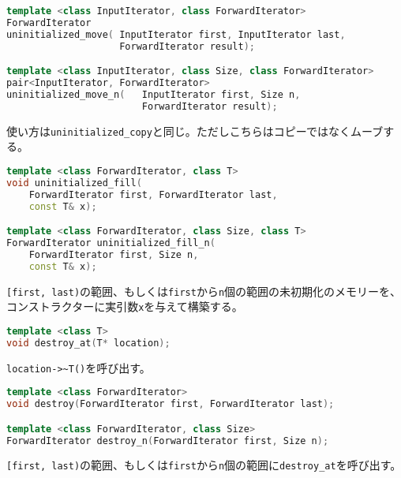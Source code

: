 \bgroup
\begin{lstlisting}[language=C++]
template <class InputIterator, class ForwardIterator>
ForwardIterator
uninitialized_move( InputIterator first, InputIterator last,
                    ForwardIterator result);

template <class InputIterator, class Size, class ForwardIterator>
pair<InputIterator, ForwardIterator>
uninitialized_move_n(   InputIterator first, Size n,
                        ForwardIterator result);
\end{lstlisting}
\egroup

使い方は\lstinline!uninitialized_copy!と同じ。ただしこちらはコピーではなくムーブする。

%

\bgroup
\begin{lstlisting}[language=C++]
template <class ForwardIterator, class T>
void uninitialized_fill(
    ForwardIterator first, ForwardIterator last,
    const T& x);

template <class ForwardIterator, class Size, class T>
ForwardIterator uninitialized_fill_n(
    ForwardIterator first, Size n,
    const T& x);
\end{lstlisting}
\egroup

\lstinline![first, last)!の範囲、もしくは\lstinline!first!から\lstinline!n!個の範囲の未初期化のメモリーを、コンストラクターに実引数\lstinline!x!を与えて構築する。

%

\bgroup
\begin{lstlisting}[language=C++]
template <class T>
void destroy_at(T* location);
\end{lstlisting}
\egroup

\lstinline!location->~T()!を呼び出す。

\begin{lstlisting}[language=C++]
template <class ForwardIterator>
void destroy(ForwardIterator first, ForwardIterator last);

template <class ForwardIterator, class Size>
ForwardIterator destroy_n(ForwardIterator first, Size n);
\end{lstlisting}

\lstinline![first, last)!の範囲、もしくは\lstinline!first!から\lstinline!n!個の範囲に\lstinline!destroy_at!を呼び出す。
